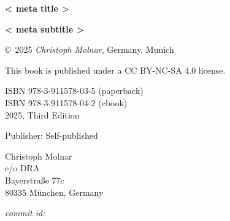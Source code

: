 \thispagestyle{empty}

\newcommand{\authorMail}{science-book@christophmolnar.com}
\newcommand{\authorAddress}{%

Christoph Molnar \\
c/o DRA \\
Bayerstraße 77c \\
80335 München, Germany \\
}
\newcommand{\isbn}{}
\newcommand{\edition}{Third Edition}
\newcommand{\publicationYear}{2025}

\thispagestyle{empty}
\begin{center}
  {
  \bfseries \sffamily \LARGE {{< meta title >}}\par
  \bfseries \small {{< meta subtitle >}}\par
}
\copyright~\publicationYear \textit{ Christoph Molnar}, Germany, Munich\\

\vspace*{\baselineskip}

This book is published under a CC BY-NC-SA 4.0 license.


ISBN 978-3-911578-03-5 (paperback) \\
ISBN 978-3-911578-04-2 (ebook) \\

\publicationYear, \edition

\textsc{} 

Publisher: Self-published

\authorAddress

\vspace*{1cm}

\textit{commit id: }

\end{center}

\newpage
\thispagestyle{empty}
\mbox{}
\newpage

